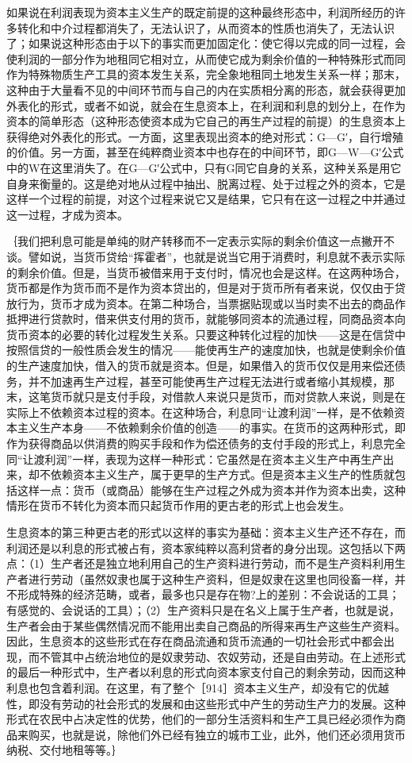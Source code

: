 如果说在利润表现为资本主义生产的既定前提的这种最终形态中，利润所经历的许多转化和中介过程都消失了，无法认识了，从而资本的性质也消失了，无法认识了；如果说这种形态由于以下的事实而更加固定化：使它得以完成的同一过程，会使利润的一部分作为地租同它相对立，从而使它成为剩余价值的一种特殊形式而同作为特殊物质生产工具的资本发生关系，完全象地租同土地发生关系一样；那末，这种由于大量看不见的中间环节而与自己的内在实质相分离的形态，就会获得更加外表化的形式，或者不如说，就会在生息资本上，在利润和利息的划分上，在作为资本的简单形态（这种形态使资本成为它自己的再生产过程的前提）的生息资本上获得绝对外表化的形式。一方面，这里表现出资本的绝对形式：G—G′，自行增殖的价值。另一方面，甚至在纯粹商业资本中也存在的中间环节，即G—W—G′公式中的W在这里消失了。在G—G′公式中，只有G同它自身的关系，这种关系是用它自身来衡量的。这是绝对地从过程中抽出、脱离过程、处于过程之外的资本，它是这样一个过程的前提，对这个过程来说它又是结果，它只有在这一过程之中并通过这一过程，才成为资本。

｛我们把利息可能是单纯的财产转移而不一定表示实际的剩余价值这一点撇开不谈。譬如说，当货币贷给“挥霍者”，也就是说当它用于消费时，利息就不表示实际的剩余价值。但是，当货币被借来用于支付时，情况也会是这样。在这两种场合，货币都是作为货币而不是作为资本贷出的，但是对于货币所有者来说，仅仅由于贷放行为，货币才成为资本。在第二种场合，当票据贴现或以当时卖不出去的商品作抵押进行贷款时，借来供支付用的货币，就能够同资本的流通过程，同商品资本向货币资本的必要的转化过程发生关系。只要这种转化过程的加快——这是在信贷中按照信贷的一般性质会发生的情况——能使再生产的速度加快，也就是使剩余价值的生产速度加快，借入的货币就是资本。但是，如果借入的货币仅仅是用来偿还债务，并不加速再生产过程，甚至可能使再生产过程无法进行或者缩小其规模，那末，这笔货币就只是支付手段，对借款人来说只是货币，而对贷款人来说，则是在实际上不依赖资本过程的资本。在这种场合，利息同“让渡利润”一样，是不依赖资本主义生产本身——不依赖剩余价值的创造——的事实。在货币的这两种形式，即作为获得商品以供消费的购买手段和作为偿还债务的支付手段的形式上，利息完全同“让渡利润”一样，表现为这样一种形式：它虽然是在资本主义生产中再生产出来，却不依赖资本主义生产，属于更早的生产方式。但是资本主义生产的性质就包括这样一点：货币（或商品）能够在生产过程之外成为资本并作为资本出卖，这种情形在货币不转化为资本而只起货币作用的更古老的形式上也会发生。

生息资本的第三种更古老的形式以这样的事实为基础：资本主义生产还不存在，而利润还是以利息的形式被占有，资本家纯粹以高利贷者的身分出现。这包括以下两点：（1）生产者还是独立地利用自己的生产资料进行劳动，而不是生产资料利用生产者进行劳动（虽然奴隶也属于这种生产资料，但是奴隶在这里也同役畜一样，并不形成特殊的经济范畴，或者，最多也只是存在物?上的差别：不会说话的工具；有感觉的、会说话的工具）；（2）生产资料只是在名义上属于生产者，也就是说，生产者会由于某些偶然情况而不能用出卖自己商品的所得来再生产这些生产资料。因此，生息资本的这些形式在存在商品流通和货币流通的一切社会形式中都会出现，而不管其中占统治地位的是奴隶劳动、农奴劳动，还是自由劳动。在上述形式的最后一种形式中，生产者以利息的形式向资本家支付自己的剩余劳动，因而这种利息也包含着利润。在这里，有了整个［914］资本主义生产，却没有它的优越性，即没有劳动的社会形式的发展和由这些形式中产生的劳动生产力的发展。这种形式在农民中占决定性的优势，他们的一部分生活资料和生产工具已经必须作为商品来购买，也就是说，除他们外已经有独立的城市工业，此外，他们还必须用货币纳税、交付地租等等。｝

